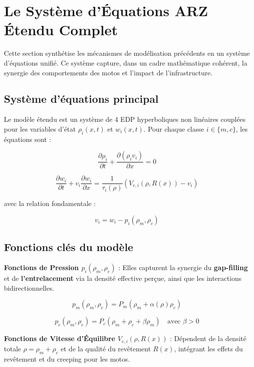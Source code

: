 \section{Le Système d'Équations ARZ Étendu Complet}
Cette section synthétise les mécanismes de modélisation précédents en un système d'équations unifié. Ce système capture, dans un cadre mathématique cohérent, la synergie des comportements des motos et l'impact de l'infrastructure.

\subsection{Système d'équations principal}
Le modèle étendu est un système de 4 EDP hyperboliques non linéaires couplées pour les variables d'état $\rho_i(x, t)$ et $w_i(x, t)$. Pour chaque classe $i \in \{m, c\}$, les équations sont :

\begin{equation}
\frac{\partial \rho_i}{\partial t} + \frac{\partial (\rho_i v_i)}{\partial x} = 0
\end{equation}

\begin{equation}
\frac{\partial w_i}{\partial t} + v_i \frac{\partial w_i}{\partial x} = \frac{1}{\tau_i(\rho)} (V_{e,i}(\rho, R(x)) - v_i)
\end{equation}

avec la relation fondamentale :

\begin{equation}
v_i = w_i - p_i(\rho_m, \rho_c)
\end{equation}

\subsection{Fonctions clés du modèle}
\textbf{Fonctions de Pression $p_i(\rho_m, \rho_c)$} : Elles capturent la synergie du \textbf{gap-filling} et de \textbf{l'entrelacement} via la densité effective perçue, ainsi que les interactions bidirectionnelles.

\begin{equation}
p_m(\rho_m, \rho_c) = P_m(\rho_m + \alpha(\rho) \rho_c)
\end{equation}

\begin{equation}
p_c(\rho_m, \rho_c) = P_c(\rho_m + \rho_c + \beta \rho_m) \quad \text{avec } \beta > 0
\end{equation}

\textbf{Fonctions de Vitesse d'Équilibre $V_{e,i}(\rho, R(x))$} : Dépendent de la densité totale $\rho = \rho_m + \rho_c$ et de la qualité du revêtement $R(x)$, intégrant les effets du revêtement et du creeping pour les motos.

